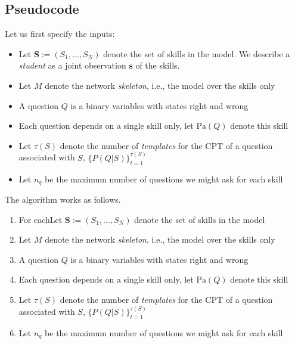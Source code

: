 \documentclass[runningheads]{llncs}
\begin{document}
	
	
	\subsection*{Pseudocode}
	Let us first specify the inputs:
	\begin{itemize}
		\item Let $\bm{S}:=(S_1,\ldots,S_N)$ denote the set of skills in the model. We 
		describe a \emph{student} as a joint observation $\bm{s}$ of the skills.
		\item Let $M$ denote the network \emph{skeleton}, i.e., the model over the skills only
		\item A question $Q$ is a binary variables with states right and wrong
		\item Each question depends on a single skill only, let $\mathrm{Pa}(Q)$ denote this 
		skill
		\item Let $\tau(S)$ denote the number of \emph{templates} for the CPT of a question 
		associated with $S$, $\{P(Q|S)\}_{t=1}^{\tau(S)}$ 
		\item Let $n_q$ be the maximum number of questions we might ask for each skill
	\end{itemize}
	The algorithm works as follows.
	\begin{enumerate}
		\item For eachLet $\bm{S}:=(S_1,\ldots,S_N)$ denote the set of skills in the model
		\item Let $M$ denote the network \emph{skeleton}, i.e., the model over the skills only
		\item A question $Q$ is a binary variables with states right and wrong
		\item Each question depends on a single skill only, let $\mathrm{Pa}(Q)$ denote this 
		skill
		\item Let $\tau(S)$ denote the number of \emph{templates} for the CPT of a question 
		associated with $S$, $\{P(Q|S)\}_{t=1}^{\tau(S)}$ 
		\item Let $n_q$ be the maximum number of questions we might ask for each skill
	\end{enumerate}
	
\end{document}
